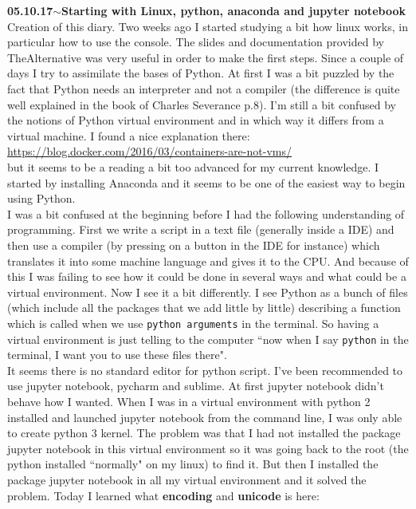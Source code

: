 \documentclass[11pt,a4paper]{article}
\newenvironment{loggentry}[2]%
{\noindent\textbf{#1}\hspace{1cm}$\mathbf{\sim}$\text{ }\textbf{#2}\\}{\vspace{0.5cm}}
\begin{document}
\begin{loggentry}{05.10.17}{Starting with Linux, python, anaconda and jupyter notebook}
	Creation of this diary. Two weeks ago I started studying a bit how linux works, in particular how to use the console. The slides and documentation provided by TheAlternative was very useful in order to make the first steps. Since a couple of days I try to assimilate the bases of Python. At first I was a bit puzzled by the fact that Python needs an interpreter and not a compiler (the difference is quite well explained in the book of Charles Severance p.8). I'm still a bit confused by the notions of Python virtual environment and in which way it differs from a virtual machine. I found a nice explanation there:\\
\url{https://blog.docker.com/2016/03/containers-are-not-vms/}\\
but it seems to be a reading a bit too advanced for my current knowledge. I started by installing Anaconda and it seems to be one of the easiest way to begin using Python.\\
I was a bit confused at the beginning before I had the following understanding of programming. First we write a script in a text file (generally inside a IDE) and then use a compiler (by pressing on a button in the IDE for instance) which translates it into some machine language and gives it to the CPU. And because of this I was failing to see how it could be done in several ways and what could be a virtual environment. Now I see it a bit differently. I see Python as a bunch of files (which include all the packages that we add little by little) describing a function which is called when we use \texttt{python arguments} in the terminal. So having a virtual environment is just telling to the computer ``now when I say \texttt{python} in the terminal, I want you to use these files there".\\
It seems there is no standard editor for python script. I've been recommended to use jupyter notebook, pycharm and sublime. At first jupyter notebook didn't behave how I wanted. When I was in a virtual environment with python 2 installed and launched jupyter notebook from the command line, I was only able to create python 3 kernel. The problem was that I had not installed the package jupyter notebook in this virtual environment so it was going back to the root (the python installed ``normally" on my linux) to find it. But then I installed the package jupyter notebook in all my virtual environment and it solved the problem.
Today I learned what \textbf{encoding} and \textbf{unicode} is here:\\

\end{loggentry}
\end{document}
